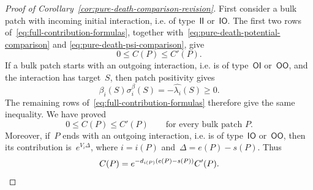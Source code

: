 \documentclass[EJP,preprint,NODS,nobera]{ejpecp}
\begin{document}
\begin{proof}[Proof of Corollary~\ref{cor:pure-death-comparison-revision}]
First consider a bulk patch with incoming initial interaction, i.e. of type~$\mathsf{II}$ or~$\mathsf{IO}$. The first two
rows of~\eqref{eq:full-contribution-formulas},
together with~\eqref{eq:pure-death-potential-comparison} and
\eqref{eq:pure-death-psi-comparison}, give
\begin{equation*}
0\leq C(P)\leq C'(P).
\end{equation*}
If a bulk patch starts with an outgoing interaction, i.e. is of type~$\mathsf{OI}$ or~$\mathsf{OO}$, and the interaction has target~$S$, then patch positivity gives
\begin{equation*}
\beta_i(S)\sigma_i^\beta(S)
=
-\widehat{\lambda_i}(S)
\geq0.
\end{equation*}
The remaining rows of~\eqref{eq:full-contribution-formulas} therefore give the
same inequality. We have proved
\begin{equation}
\label{eq:pure-death-bulk-patch-comparison}
0\leq C(P)\leq C'(P)
\qquad
\text{for every bulk patch }P.
\end{equation}
Moreover, if~$P$ ends with an outgoing interaction, i.e. is of type~$\mathsf{IO}$ or~$\mathsf{OO}$, then its contribution is~$e^{V_i\Delta}$, where
$i=i(P)$ and~$\Delta=e(P)-s(P)$. Thus
\begin{equation}
\label{eq:pure-death-outgoing-terminal-factor}
C(P)
=
e^{-d_{i(P)}\left(e(P)-s(P)\right)}C'(P).
\end{equation}


\end{proof}
\end{document}
